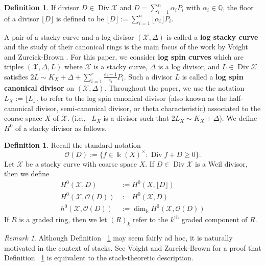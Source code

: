 \documentclass{amsart}
\theoremstyle{plain}
\theoremstyle{definition}
\newtheorem{defn}[thm]{Definition}
\theoremstyle{remark}
\newtheorem{rem}[thm]{Remark}
\numberwithin{equation}{section}
\newcommand\BQ{{\mathbb Q}}
\newcommand\Bk{{\Bbbk}}
\newcommand\sco{{\mathscr O}}
\DeclareMathOperator\di{Div}
\newcommand\sx{\mathscr X}
\newcommand{\halfcan}{L}
\begin{document}
\begin{defn}
\label{defn:divisor-floor}
If divisor $D \in \di \sx$ and $D = \sum_{i = 1}^{n} \alpha_i P_i$
with $\alpha_i \in \BQ$, the floor of a divisor $\lfloor D
\rfloor$ is defined to be $\lfloor D \rfloor := \sum_{i = 1}^{n}
\lfloor \alpha_i \rfloor P_i$.
\end{defn}

A pair of a stacky curve and a log divisor $(\sx, \Delta)$ is
called a \textbf{log stacky curve} and the study of their
canonical rings is the main focus of the work by Voight and 
Zureick-Brown \cite{vzb:stacky}. For this paper, we consider \textbf{log
spin curves} which are triples $(\sx, \Delta, \halfcan)$ where $\sx$
is a stacky curve, $\Delta$ is a log divisor, and $\halfcan \in \di
\sx$ satisfies $2 \halfcan \sim K_X + \Delta + \sum_{i = 1}^{r}
\frac{e_i - 1}{e_i} P_i$. Such a divisor $\halfcan$ is called a
\textbf{log spin canonical divisor} on $(\sx, \Delta)$. Throughout the paper, we use
the notation $\halfcan_X := \lfloor L \rfloor.$ to refer to the log spin
canonical divisor (also known as the half-canonical divisor, 
semi-canonical divisor, or theta characteristic) associated to the
coarse space $X$ of $\sx.$  (i.e.,~ $\halfcan_X$ is a divisor such
that $2\halfcan_X \sim K_X + \Delta$). 
We define $H^0$ of a stacky divisor as follows.

\begin{defn}
\label{defn:h0-stacky}
Recall the standard notation 
$$\sco(D) := \{f \in \Bk(X)^\times : \di f + D \geq 0 \}.$$
Let $\sx$ be a stacky curve with coarse space $X$.
If $D \in \di \sx$ is a Weil divisor, then we define
\begin{align*}
	H^0(\sx, D) &:= H^0(X, \lfloor D \rfloor)\\
	H^0(\sx, \sco(D)) &:= H^0(\sx, D)\\
	h^0(\sx, \sco(D)) &:= \dim_\Bk H^0(\sx, \sco(D))
\end{align*}
If $R$ is a graded ring, then we let $(R)_k$ refer to the $k^\text{th}$
graded component of $R$.

\end{defn}

\begin{rem}
Although Definition ~\ref{defn:h0-stacky} may seem fairly ad hoc, it is naturally motivated in the context of stacks. See Voight and Zureick-Brown \cite[Lemma 5.4.7]{vzb:stacky} for a proof that Definition ~\ref{defn:h0-stacky} is equivalent to the stack-theoretic description.
\end{rem}
\end{document}

